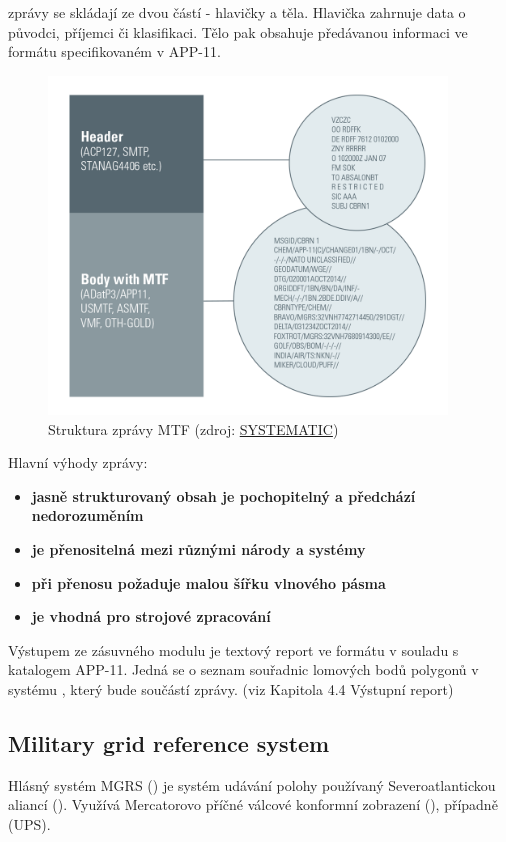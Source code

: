  zprávy se skládají ze dvou částí - hlavičky a těla. Hlavička zahrnuje data o původci, příjemci či klasifikaci. Tělo pak obsahuje předávanou informaci ve formátu specifikovaném v APP-11. 

\begin{figure}[H]
    \centering
      \includegraphics[width=300pt]{./pictures/Military-Messaging-white-borders-988px.png}
      \caption[Struktura zprávy MTF]{Struktura zprávy MTF
      (zdroj: \href{https://systematic.com/defence/products/a/military-messaging/app-11-and-adatp-3/}{SYSTEMATIC})}
      \label{fig:systematic}
  \end{figure}
  
Hlavní výhody  zprávy:

\begin{itemize}
	\item \textbf{jasně strukturovaný obsah je pochopitelný a předchází nedorozuměním} 
	\item \textbf{je přenositelná mezi různými národy a systémy} 
	\item \textbf{při přenosu požaduje malou šířku vlnového pásma}
	\item \textbf{je vhodná pro strojové zpracování}
\end{itemize}

Výstupem ze zásuvného modulu je textový report ve formátu v souladu s katalogem APP-11. Jedná se o seznam souřadnic lomových bodů polygonů v systému , který bude součástí  zprávy. (viz Kapitola 4.4 Výstupní report)

\subsection{Military grid reference system}
Hlásný systém MGRS () je systém udávání polohy používaný Severoatlantickou aliancí (). Využívá Mercatorovo příčné válcové konformní zobrazení (), případně \zk(UPS). 

